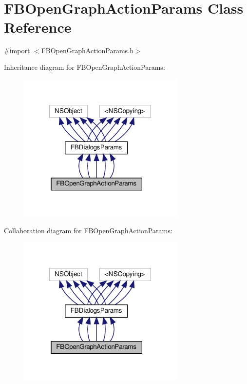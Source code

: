 \hypertarget{interfaceFBOpenGraphActionParams}{}\section{F\+B\+Open\+Graph\+Action\+Params Class Reference}
\label{interfaceFBOpenGraphActionParams}


{\ttfamily \#import $<$F\+B\+Open\+Graph\+Action\+Params.\+h$>$}



Inheritance diagram for F\+B\+Open\+Graph\+Action\+Params\+:
\nopagebreak
\begin{figure}[H]
\begin{center}
\leavevmode
\includegraphics[width=236pt]{interfaceFBOpenGraphActionParams__inherit__graph}
\end{center}
\end{figure}


Collaboration diagram for F\+B\+Open\+Graph\+Action\+Params\+:
\nopagebreak
\begin{figure}[H]
\begin{center}
\leavevmode
\includegraphics[width=236pt]{interfaceFBOpenGraphActionParams__coll__graph}
\end{center}
\end{figure}
